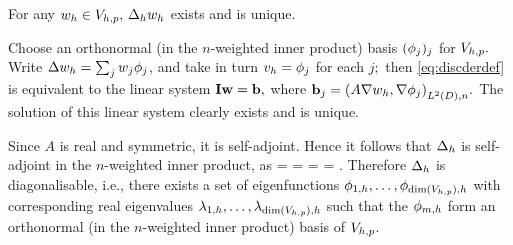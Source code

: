 \label{lem:ddwd}
For any $w_{h} \in V_{h,p},$ $\Delta_{h} w_{h}$ exists and is unique.
\ele

Choose an orthonormal (in the $n$-weighted inner product) basis  $(\phi_{j})_j$ for $V_{h,p}.$ Write $\Delta w_{h} = \sum_j w_{j} \phi_{j}$, and take in turn $v_{h} = \phi_{j}$ for each $j;$ then \cref{eq:discderdef} is equivalent to the linear system $\mathbf{I} \mathbf{w} = \mathbf{b},$ where $\bb_{j} = \IPLtDn{A \grad \wh}{\grad \phij}.$ The solution of this linear system clearly exists and is unique.
\epf


Since $A$ is real and symmetric, it is self-adjoint. Hence it follows that $\Delta_{h}$ is self-adjoint in the $n$-weighted inner product, as
\beqs
\IPLtDn{\Deltah \wh}{\vh} =  =  = \overline{\IPLtDn{\Deltah \vh}{\wh}} = \IPLtDn{\wh}{\Deltah \vh}.
\eeqs
Therefore $\Delta_{h}$ is diagonalisable, i.e., there exists a set of eigenfunctions $\phioh,\ldots,\phidimVhph$  with corresponding real eigenvalues $\lambdaoh, \ldots, \lambdadimVhph$ such that the $\phi_{m,h}$ form an orthonormal (in the $n$-weighted inner product) basis of $V_{h,p}$.

